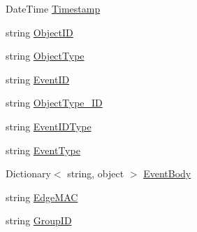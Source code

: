 \begin{DoxyCompactItemize}
\item 
Date\+Time \mbox{\hyperlink{class_blue_cats_1_1_loop_1_1_api_1_1_client_1_1_models_1_1_event_ade843ada3b221a83a2a5eeb2a9d1d8b4}{Timestamp}}
\item 
string \mbox{\hyperlink{class_blue_cats_1_1_loop_1_1_api_1_1_client_1_1_models_1_1_event_add855b2c8ce45c2f1dfa7e572c0bcba5}{Object\+ID}}
\item 
string \mbox{\hyperlink{class_blue_cats_1_1_loop_1_1_api_1_1_client_1_1_models_1_1_event_ada0b0a3733934eba70139c200ad9f6a9}{Object\+Type}}
\item 
string \mbox{\hyperlink{class_blue_cats_1_1_loop_1_1_api_1_1_client_1_1_models_1_1_event_a2feecfb5596209f2bc286c08164962e1}{Event\+ID}}
\item 
string \mbox{\hyperlink{class_blue_cats_1_1_loop_1_1_api_1_1_client_1_1_models_1_1_event_a689738a89d482f3ac829af304a331f3c}{Object\+Type\+\_\+\+ID}}
\item 
string \mbox{\hyperlink{class_blue_cats_1_1_loop_1_1_api_1_1_client_1_1_models_1_1_event_acebb5ab88c8eea24404dc1a49b965327}{Event\+I\+D\+Type}}
\item 
string \mbox{\hyperlink{class_blue_cats_1_1_loop_1_1_api_1_1_client_1_1_models_1_1_event_adbc13f75b82c180d65db8e53ba4dba41}{Event\+Type}}
\item 
Dictionary$<$ string, object $>$ \mbox{\hyperlink{class_blue_cats_1_1_loop_1_1_api_1_1_client_1_1_models_1_1_event_a87516d7683bb7573bced2899d48207b0}{Event\+Body}}
\item 
string \mbox{\hyperlink{class_blue_cats_1_1_loop_1_1_api_1_1_client_1_1_models_1_1_event_a0fa731ce742ef6c9e095eb0876ec8665}{Edge\+M\+AC}}
\item 
string \mbox{\hyperlink{class_blue_cats_1_1_loop_1_1_api_1_1_client_1_1_models_1_1_event_a44ccd4e96fa96c63da4153b8cfdb3562}{Group\+ID}}
\end{DoxyCompactItemize}



